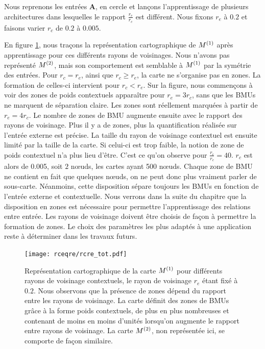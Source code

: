 \documentclass[../main]{subfiles}
\begin{document}
Nous reprenons les entrées \textbf{A}, en cercle et lançons l'apprentissage de plusieurs architectures dans lesquelles le rapport $\frac{r_e}{r_c}$ est différent.
Nous fixons $r_e$ à $0.2$ et faisons varier $r_c$ de $0.2$ à $0.005$.

En figure \ref{fig:rcre}, nous traçons la représentation cartographique de $M^{({1})}$ après apprentissage pour ces différents rayons de voisinages.  Nous n'avons pas représenté $M^{({2})}$, mais son comportement est semblable à $M^{({1})}$ par la symétrie des entrées.
Pour $r_c = r_e$, ainsi que $r_c \geq r_e$, la carte ne s'organise pas en zones. 
La formation de celles-ci intervient pour $r_c < r_e$. Sur la figure, nous commençons à voir des zones de poids contextuels apparaître pour $r_e = 3r_c$, sans que les BMUs ne marquent de séparation claire. Les zones sont réellement marquées à partir de $r_e = 4r_c$.
Le nombre de zones de BMU augmente ensuite avec le rapport des rayons de voisinage. Plus il y a de zones, plus la quantification réalisée sur l'entrée externe est précise.
La taille du rayon de voisinage contextuel est ensuite limité par la taille de la carte. Si celui-ci est trop faible, la notion de zone de poids contextuel n'a plus lieu d'être. C'est ce qu'on observe pour $\frac{r_e}{r_c} = 40$. $r_c$ est alors de 0.005, soit $2$ n\oe{}uds, les cartes ayant 500 n\oe{}uds. 
Chaque zone de BMU ne contient en fait que quelques n\oe{}uds, on ne peut donc plus vraiment parler de sous-carte. Néanmoins, cette disposition sépare toujours les BMUs en fonction de l'entrée externe et contextuelle. 
Nous verrons dans la suite du chapitre que la disposition en zones est nécessaire pour permettre l'apprentissage des relations entre entrée. Les rayons de voisinage doivent être choisis de façon à permettre la formation de zones. 
Le choix des paramètres les plus adaptés à une application reste à déterminer dans les travaux futurs.

\begin{figure}[ht]
	\texttt{[image: rceqre/rcre\_tot.pdf]}
	\caption{Représentation cartographique de la carte $M^{({1})}$ pour différents rayons de voisinage contextuels, le rayon de voisinage $r_e$ étant fixé à $0.2$. Nous observons que la présence de zones dépend du rapport entre les rayons de voisinage. La carte définit des zones de BMUs grâce à la forme poids contextuels, de plus en plus nombreuses et contenant de moins en moins d'unités lorsqu'on augmente le rapport entre rayons de voisinage.
	La carte $M^{({2})}$, non représentée ici, se comporte de façon similaire.\label{fig:rcre}
	}
\end{figure}	
\end{document}
